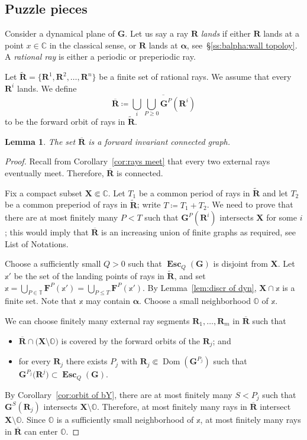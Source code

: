 \documentclass{amsart}
\newcommand{\Dom}{\operatorname {Dom}}
\newcommand{\1}{{\mathbb 1 }}
\newcommand\PT{\mathbb{ T}}
\newcommand{\bO}{{\mathbb{O}}}
\newcommand{\bF}{{\mathbf F}}
\newcommand{\bX}{{\mathbf X}}
\newcommand{\bR}{{\mathbf R}}
\newcommand{\bG}{{\mathbf G}}
\newcommand{\bxx}{{\mathbb{x}}}
\newcommand{\C}{\mathbb{C}}
\newtheorem{lem}[thm]{Lemma}
\theoremstyle{remark}
\numberwithin{equation}{section}
\theoremstyle{definition}
\newcommand{\Esc}{{\boldsymbol{\operatorname{Esc}}}}
\newcommand{\balpha}{{\boldsymbol \alpha}}
\theoremstyle{nonumberbreak}
\begin{document}
\subsection{Puzzle pieces}
\label{ss:puzzles} 
Consider a dynamical plane of $\bG$. Let us say a ray $\bR$ \emph{lands} if either $\bR$ lands at a point $x\in \C$ in the classical sense, or $\bR$ lands at $\balpha$, see~\S\ref{ss:balpha:wall topoloy}. A \emph{rational ray} is either a periodic or preperiodic ray.



Let $\widetilde \bR= \{\bR^1,\bR^2,\dots, \bR^n\}$ be a finite set of rational rays. We assume that every $\bR^i$ lands. We define 
\[\overline \bR\coloneqq  \overline{\bigcup_{i} \bigcup_{P\ge 0} \bG^P(\bR^i)}\]
to be the forward orbit of rays in $\widetilde \bR$.
\begin{lem}
\label{lem:over R is graph}
The set $\overline \bR$ is a forward invariant connected graph.
\end{lem} 
\begin{proof}
Recall from Corollary~\ref{cor:rays meet} that every two external rays eventually meet. Therefore, $\overline \bR$ is connected. 

Fix a compact subset $\bX\Subset \C$. Let $T_1$ be a common period of rays in $\widetilde \bR$ and let $T_2$ be a common preperiod of rays in $\widetilde \bR$; write $T\coloneqq T_1+T_2$.  We need to prove that there are at most finitely many $P<T$ such that $\bG^P(\bR^i)$ intersects $\bX$ for some $i$; this would imply that $\overline \bR$ is an increasing union of finite graphs as required, see List of Notations.

Choose a sufficiently small $Q>0$ such that $\Esc_Q(\bG)$ is disjoint from $\bX$. Let $\bxx'$ be the set of the landing points of rays in $\widetilde \bR$, and set $\bxx=\bigcup_{P\in  \PT} \bF^{P}(\bxx')=\bigcup_{P\le T} \bF^{P}(\bxx')$. By Lemma~\ref{lem:discr of dyn}, $\bX\cap \bxx$ is a finite set. Note that $\bxx$ may contain $\balpha$. Choose a small neighborhood $\bO$ of $\bxx$. 

 We can choose finitely many external ray segments $\bR_1,\dots , \bR_m$ in $\overline \bR$ such that 
 \begin{itemize}
 \item $\overline \bR\cap \big(\bX\setminus \bO\big)$ is covered by the forward orbits of the $\bR_j$; and
 \item for every $\bR_j$ there exists $P_j$ with $\bR_j\Subset \Dom( \bG^{P_j})$ such that $\bG^{P_j}\big(\bR^j\big)\subset \Esc_Q(\bG)$.
 \end{itemize}
 By Corollary~\ref{cor:orbit of bY}, there are at most finitely many $S<P_j$ such that $\bG^S(\bR_j)$ intersects $\bX\setminus \bO$. Therefore, at most finitely many rays in $\overline \bR$ intersect $\bX\setminus \bO$. Since $\bO$ is a sufficiently small neighborhood of $\bxx$, at most finitely many rays in $\overline \bR$ can enter $\bO$.
\end{proof}
\end{document}
